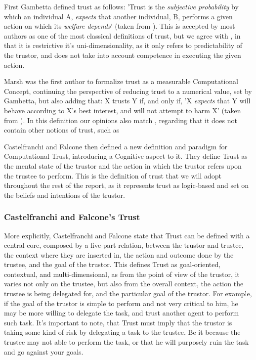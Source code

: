 \begin{itemize}
	\tallitem First Gambetta\cite{Gambetta1988} defined trust as follows: 'Trust is the \textit{subjective probability} by which an individual A, \textit{expects} that another individual, B, performs a given action on which its \textit{welfare depends}' (taken from \cite{Castelfranchi2010}). This is accepted by most authors as one of the most classical definitions of trust, but we agree with \cite{Castelfranchi2010}, in that it is restrictive it's uni-dimensionality, as it only refers to predictability of the trustor, and does not take into account competence in executing the given action.
	
	\tallitem Marsh\cite{Marsh1994} was the first author to formalize trust as a measurable Computational Concept, continuing the perspective of reducing trust to a numerical value, set by Gambetta\cite{Gambetta1988}, but also adding that: X trusts Y if, and only if, 'X \textit{expects} that Y will behave according to X's best interest, and will not attempt to harm X' (taken from \cite{Castelfranchi2010}). In this definition our opinions also match \cite{Castelfranchi2010}, regarding that it does not contain other notions of trust, such as  
	
	\tallitem Castelfranchi and Falcone then defined a new definition and paradigm for Computational Trust, introducing a Cognitive aspect to it\cite{Castelfranchi1998}. They define Trust as the mental state of the trustor and the action in which the trustor refers upon the trustee to perform. This is the definition of trust that we will adopt throughout the rest of the report, as it represents trust as logic-based and set on the beliefs and intentions of the trustor.
\end{itemize}

\subsubsection{Castelfranchi and Falcone's Trust}
\label{subsubsec:CastelfranchiTrust}
More explicitly, Castelfranchi and Falcone\cite{Castelfranchi1998} state that Trust can be defined with a central core, composed by a five-part relation, between the trustor and trustee, the context where they are inserted in, the action and outcome done by the trustee, and the goal of the trustor. This defines Trust as goal-oriented, contextual, and multi-dimensional, as from the point of view of the trustor, it varies not only on the trustee, but also from the overall context, the action the trustee is being delegated for, and the particular goal of the trustor. For example, if the goal of the trustor is simple to perform and not very critical to him, he may be more willing to delegate the task, and trust another agent to perform such task. It's important to note, that Trust must imply that the trustor is taking some kind of risk by delegating a task to the trustee. Be it because the trustee may not able to perform the task, or that he will purposely ruin the task and go against your goals.


